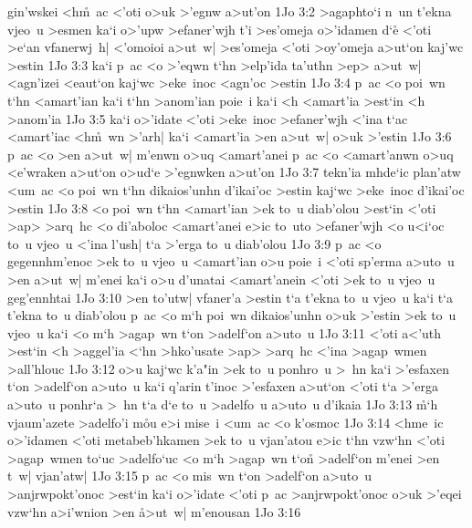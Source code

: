 gin'wskei
<h\r{m}~ac
<'oti
o>uk
>'egnw
a>ut'on\bibvsend
\vs 1Jo 3:2
>agaphto`i
n~un
t'ekna
vjeo~u
>esmen
ka`i
o>'upw
>efaner'wjh
t'i
>es'omeja
o>'idamen
d`e\r{}
<'oti
>e`an
vfanerwj~h|
<'omoioi
a>ut~w|
>es'omeja
<'oti
>oy'omeja
a>ut`on
kaj'wc
>estin\bibvsend
\vs 1Jo 3:3
ka`i
p~ac
<o
>'eqwn
t`hn
>elp'ida
ta'uthn
>ep>
a>ut~w|
<agn'izei
<eaut`on
kaj`wc
>eke~inoc
<agn'oc
>estin\bibvsend
\vs 1Jo 3:4
p~ac
<o
poi~wn
t`hn
<amart'ian
ka`i
t`hn
>anom'ian
poie~i
ka`i
<h
<amart'ia
>est`in
<h
>anom'ia\bibvsend
\vs 1Jo 3:5
ka`i
o>'idate
<'oti
>eke~inoc
>efaner'wjh
<'ina
t`ac
<amart'iac
<h\r{m}~wn
>'arh|
ka`i
<amart'ia
>en
a>ut~w|
o>uk
>'estin\bibvsend
\vs 1Jo 3:6
p~ac
<o
>en
a>ut~w|
m'enwn
o>uq
<amart'anei
p~ac
<o
<amart'anwn
o>uq
<e'wraken
a>ut`on
o>ud`e
>'egnwken
a>ut'on\bibvsend
\vs 1Jo 3:7
tekn'ia
mhde`ic
plan'atw
<um~ac
<o
poi~wn
t`hn
dikaios'unhn
d'ikai'oc
>estin
kaj`wc
>eke~inoc
d'ikai'oc
>estin\bibvsend
\vs 1Jo 3:8
<o
poi~wn
t`hn
<amart'ian
>ek
to~u
diab'olou
>est`in
<'oti
>ap>
>arq~hc
<o
di'aboloc
<amart'anei
e>ic
to~uto
>efaner'wjh
<o
u<i`oc
to~u
vjeo~u
<'ina
l'ush|
t`a
>'erga
to~u
diab'olou\bibvsend
\vs 1Jo 3:9
p~ac
<o
gegennhm'enoc
>ek
to~u
vjeo~u
<amart'ian
o>u
poie~i
<'oti
sp'erma
a>uto~u
>en
a>ut~w|
m'enei
ka`i
o>u
d'unatai
<amart'anein
<'oti
>ek
to~u
vjeo~u
geg'ennhtai\bibvsend
\vs 1Jo 3:10
>en
to'utw|
vfaner'a
>estin
t`a
t'ekna
to~u
vjeo~u
ka`i
t`a
t'ekna
to~u
diab'olou
p~ac
<o
m`h
poi~wn
dikaios'unhn
o>uk
>'estin
>ek
to~u
vjeo~u
ka`i
<o
m`h
>agap~wn
t`on
>adelf`on
a>uto~u\bibvsend
\vs 1Jo 3:11
<'oti
a<'uth
>est`in
<h
>aggel'ia
<`hn
>hko'usate
>ap>
>arq~hc
<'ina
>agap~wmen
>all'hlouc\bibvsend
\vs 1Jo 3:12
o>u
kaj`wc
k'a"in
>ek
to~u
ponhro~u
>~hn
ka`i
>'esfaxen
t`on
>adelf`on
a>uto~u
ka`i
q'arin
t'inoc
>'esfaxen
a>ut`on
<'oti
t`a
>'erga
a>uto~u
ponhr`a
>~hn
t`a
d`e
to~u
>adelfo~u
a>uto~u
d'ikaia\bibvsend
\vs 1Jo 3:13
\r{m}`h
vjaum'azete
>adelfo'i
m\r{o}u
e>i
mise~i
<um~ac
<o
k'osmoc\bibvsend
\vs 1Jo 3:14
<hme~ic
o>'idamen
<'oti
metabeb'hkamen
>ek
to~u
vjan'atou
e>ic
t`hn
vzw`hn
<'oti
>agap~wmen
to`uc
>adelfo`uc
<o
m`h
>agap~wn
t`on\r{}
>adelf`on
m'enei
>en
t~w|
vjan'atw|\bibvsend
\vs 1Jo 3:15
p~ac
<o
mis~wn
t`on
>adelf`on
a>uto~u
>anjrwpokt'onoc
>est`in
ka`i
o>'idate
<'oti
p~ac
>anjrwpokt'onoc
o>uk
>'eqei
vzw`hn
a>i'wnion
>en
\r{a}>ut~w|
m'enousan\bibvsend
\vs 1Jo 3:16
